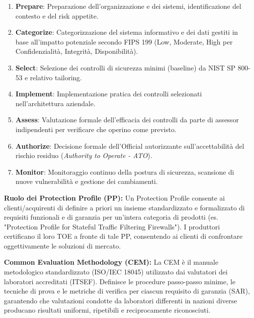 \documentclass[11pt,a4paper]{article}
\begin{document}
\begin{solutionbox}
\begin{enumerate}
    \item \textbf{Prepare}: Preparazione dell'organizzazione e dei sistemi, identificazione del contesto e del risk appetite.
    \item \textbf{Categorize}: Categorizzazione del sistema informativo e dei dati gestiti in base all'impatto potenziale secondo FIPS 199 (Low, Moderate, High per Confidenzialit\`a, Integrit\`a, Disponibilit\`a).
    \item \textbf{Select}: Selezione dei controlli di sicurezza minimi (baseline) da NIST SP 800-53 e relativo tailoring.
    \item \textbf{Implement}: Implementazione pratica dei controlli selezionati nell'architettura aziendale.
    \item \textbf{Assess}: Valutazione formale dell'efficacia dei controlli da parte di assessor indipendenti per verificare che operino come previsto.
    \item \textbf{Authorize}: Decisione formale dell'Official autorizzante sull'accettabilit\`a del rischio residuo (\textit{Authority to Operate - ATO}).
    \item \textbf{Monitor}: Monitoraggio continuo della postura di sicurezza, scansione di nuove vulnerabilit\`a e gestione dei cambiamenti.
\end{enumerate}
\end{solutionbox}

\begin{solutionbox}
\textbf{Ruolo dei Protection Profile (PP):}
Un Protection Profile consente ai clienti/acquirenti di definire a priori un insieme standardizzato e formalizzato di requisiti funzionali e di garanzia per un'intera categoria di prodotti (es. "Protection Profile for Stateful Traffic Filtering Firewalls"). I produttori certificano il loro TOE a fronte di tale PP, consentendo ai clienti di confrontare oggettivamente le soluzioni di mercato.

\textbf{Common Evaluation Methodology (CEM):}
La CEM \`e il manuale metodologico standardizzato (ISO/IEC 18045) utilizzato dai valutatori dei laboratori accreditati (ITSEF). Definisce le procedure passo-passo minime, le tecniche di prova e le metriche di verifica per ciascun requisito di garanzia (SAR), garantendo che valutazioni condotte da laboratori differenti in nazioni diverse producano risultati uniformi, ripetibili e reciprocamente riconosciuti.
\end{solutionbox}
\end{document}
